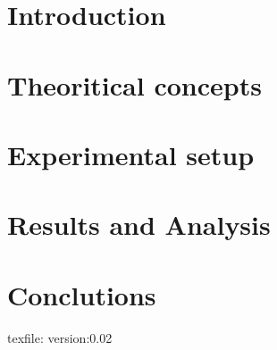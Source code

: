 \documentclass[final,5p,12pt,twocolumn]{elsaarticle}
\begin{document}
\maketitle
\clearpage

\section{Introduction}\label{introduction}

\section{Theoritical concepts}\label{theory}

\section{Experimental setup}\label{setup}

\section{Results and Analysis}\label{results}

\section{Conclutions}\label{conclutions}






texfile: version:0.02
\end{document}
